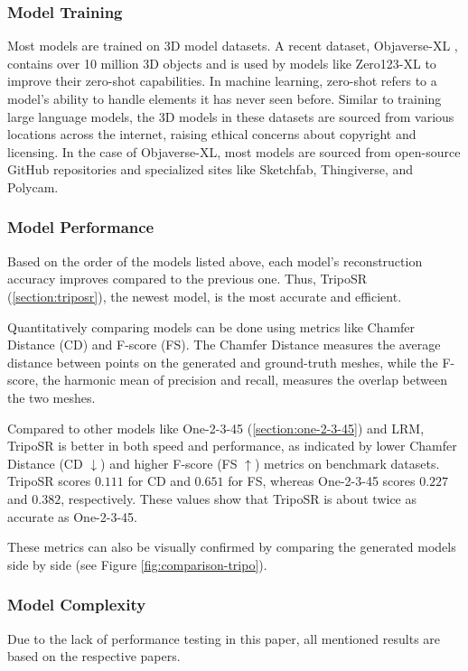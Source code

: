 \subsubsection{Model Training}
Most models are trained on 3D model datasets. A recent dataset, Objaverse-XL \autocite{deitke_objaverse-xl_2023}, contains over 10 million 3D objects and is used by models like Zero123-XL to improve their zero-shot capabilities.
In machine learning, zero-shot refers to a model's ability to handle elements it has never seen before.
Similar to training large language models, the 3D models in these datasets are sourced from various locations across the internet, raising ethical concerns about copyright and licensing.
In the case of Objaverse-XL, most models are sourced from open-source GitHub repositories and specialized sites like Sketchfab, Thingiverse, and Polycam.

\subsubsection{Model Performance}
Based on the order of the models listed above, each model's reconstruction accuracy improves compared to the previous one.
Thus, TripoSR (\ref{section:triposr}), the newest model, is the most accurate and efficient.

Quantitatively comparing models can be done using metrics like Chamfer Distance (CD) and F-score (FS). The Chamfer Distance measures the average distance between points on the generated and ground-truth meshes, while the F-score, the harmonic mean of precision and recall, measures the overlap between the two meshes.

Compared to other models like One-2-3-45 (\ref{section:one-2-3-45}) and LRM, TripoSR is better in both speed and performance, as indicated by lower Chamfer Distance (CD \(\downarrow\)) and higher F-score (FS \(\uparrow\)) metrics on benchmark datasets.
TripoSR scores \(0.111\) for CD and \(0.651\) for FS, whereas One-2-3-45 scores \(0.227\) and \(0.382\), respectively.
These values show that TripoSR is about twice as accurate as One-2-3-45.

These metrics can also be visually confirmed by comparing the generated models side by side (see Figure \ref{fig:comparison-tripo}).

\subsubsection{Model Complexity}
Due to the lack of performance testing in this paper, all mentioned results are based on the respective papers.

